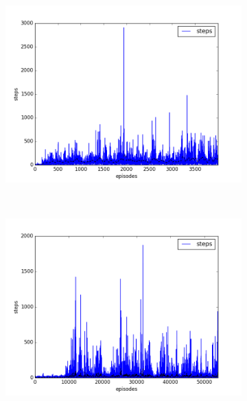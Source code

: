 \begin{figure}[t]
  \vspace*{-2.25cm}
  \begin{subfigure}[t]{\figscale\linewidth}
    \hspace*{-2.75cm}
    \includegraphics[width=1.5\textwidth]
    {../results/dqn_2vs1/steps.png}
    \label{fig:dqn-2vs1-steps}
  \end{subfigure}
  ~
  \begin{subfigure}[t]{\figscale\linewidth}
    \hspace*{-1.4cm}
    \includegraphics[width=1.5\textwidth]
    {../results/ddpg_2vs1/steps.png}
    \label{fig:ddpg-2vs1-steps}
  \end{subfigure}

\end{figure}
